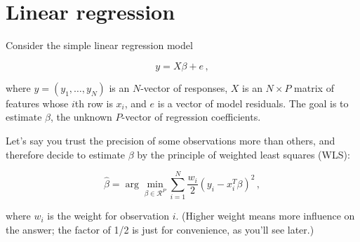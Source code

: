 \documentclass{article}
\begin{document}
\section{Linear regression}







Consider the simple linear regression model



$$

y = X \beta + e \, ,

$$

where $y = (y_1, \ldots, y_N)$ is an $N$-vector of responses, $X$ is an $N \times P$ matrix of features whose $i$th row is $x_i$, and $e$ is a vector of model residuals.  The goal is to estimate $\beta$, the unknown $P$-vector of regression coefficients.  



Let's say you trust the precision of some observations more than others, and therefore decide to estimate $\beta$ by the principle of weighted least squares (WLS):



$$

\hat{\beta} = \arg \min_{\beta \in \mathcal{R}^P} \sum_{i=1}^N \frac{w_i}{2}(y_i - x_i^T \beta)^2 \, ,

$$

where $w_i$ is the weight for observation $i$.  (Higher weight means more influence on the answer; the factor of 1/2 is just for convenience, as you'll see later.)
\end{document}
